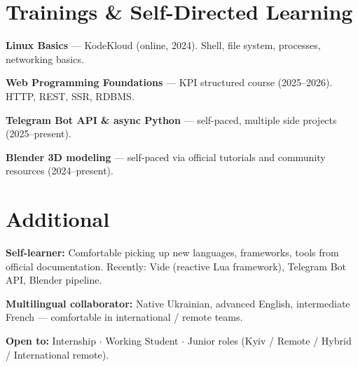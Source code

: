 \documentclass[letterpaper,11pt]{article}
\begin{document}
\section{Trainings \& Self-Directed Learning}
\begin{itemize}[leftmargin=0.15in, label={\small\textbullet}]
    \small{
      \item \textbf{Linux Basics} --- KodeKloud (online, 2024). Shell, file system, processes, networking basics.
      \item \textbf{Web Programming Foundations} --- KPI structured course (2025--2026). HTTP, REST, SSR, RDBMS.
      \item \textbf{Telegram Bot API \& async Python} --- self-paced, multiple side projects (2025--present).
      \item \textbf{Blender 3D modeling} --- self-paced via official tutorials and community resources (2024--present).
    }
\end{itemize}
\vspace{-12pt}

\section{Additional}
\begin{itemize}[leftmargin=0.15in, label={\small\textbullet}]
    \small{
      \item \textbf{Self-learner:} Comfortable picking up new languages, frameworks, tools from official documentation. Recently: Vide (reactive Lua framework), Telegram Bot API, Blender pipeline.
      \item \textbf{Multilingual collaborator:} Native Ukrainian, advanced English, intermediate French --- comfortable in international / remote teams.
      \item \textbf{Open to:} Internship $\cdot$ Working Student $\cdot$ Junior roles (Kyiv / Remote / Hybrid / International remote).
    }
\end{itemize}
\end{document}
